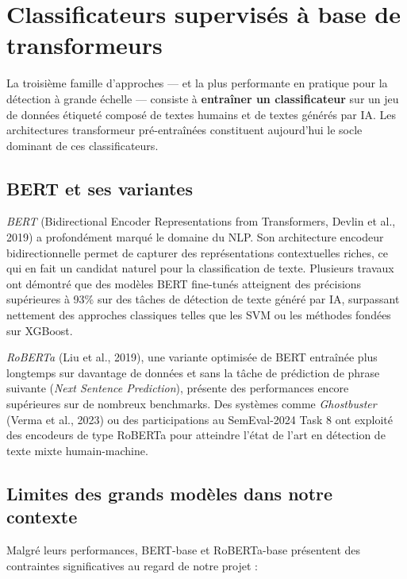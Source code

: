 ﻿\documentclass[12pt, a4paper]{report}
\begin{document}
\section{Classificateurs supervisés à base de transformeurs}

La troisième famille d'approches — et la plus performante en pratique pour la 
détection à grande échelle — consiste à \textbf{entraîner un classificateur} sur 
un jeu de données étiqueté composé de textes humains et de textes générés par IA. 
Les architectures transformeur pré-entraînées constituent aujourd'hui le socle 
dominant de ces classificateurs.

\subsection{BERT et ses variantes}

\textit{BERT} (Bidirectional Encoder Representations from Transformers, Devlin 
et al., 2019) a profondément marqué le domaine du NLP. Son architecture 
encodeur bidirectionnelle permet de capturer des représentations contextuelles 
riches, ce qui en fait un candidat naturel pour la classification de texte. 
Plusieurs travaux ont démontré que des modèles BERT fine-tunés atteignent des 
précisions supérieures à 93\% sur des tâches de détection de texte généré par IA, 
surpassant nettement des approches classiques telles que les SVM ou les méthodes 
fondées sur XGBoost.

\textit{RoBERTa} (Liu et al., 2019), une variante optimisée de BERT entraînée 
plus longtemps sur davantage de données et sans la tâche de prédiction de phrase 
suivante (\textit{Next Sentence Prediction}), présente des performances encore 
supérieures sur de nombreux benchmarks. Des systèmes comme \textit{Ghostbuster} 
(Verma et al., 2023) ou des participations au SemEval-2024 Task 8 ont exploité 
des encodeurs de type RoBERTa pour atteindre l'état de l'art en détection de 
texte mixte humain-machine.

\subsection{Limites des grands modèles dans notre contexte}

Malgré leurs performances, BERT-base et RoBERTa-base présentent des contraintes 
significatives au regard de notre projet :
\end{document}
